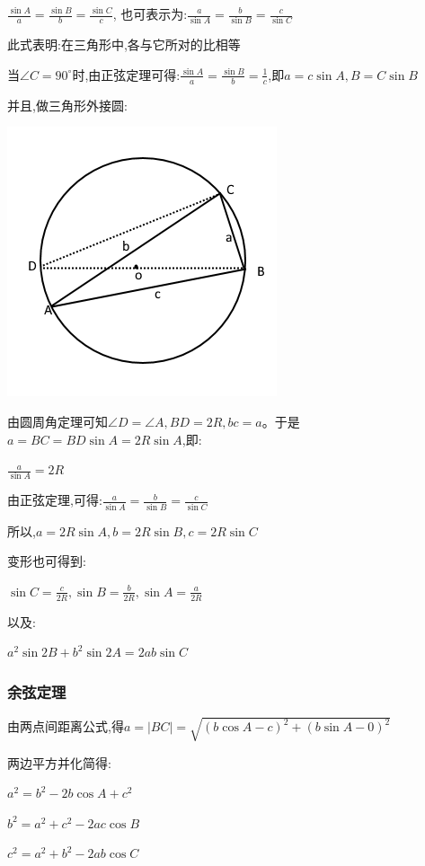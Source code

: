 \documentclass[UTF8]{ctexbook}
\newcommand{\degree}{^\circ}
\begin{document}
{{{$\frac{\sin A}{a} = \frac{\sin B}{b} = \frac{\sin C}{c}$, 也可表示为:$\frac{a}{\sin A} = \frac{b}{\sin B} = \frac{c}{\sin C}$

此式表明:在三角形中,各{}与它所对{}的比相等

当$\angle C = 90\degree$时,由正弦定理可得:$\frac{\sin A}{a} = \frac{\sin B}{b} = \frac{1}{c}$,即$a = c\sin A,B = C\sin B$

并且,做三角形外接圆:

\includegraphics[scale=0.5]{resources/insideTriangleAndCircleOutSide.png}

由圆周角定理可知$\angle D = \angle A,BD = 2R,bc = a$。于是$a = BC = BD\sin A = 2R\sin A$,即:

$\frac{a}{\sin A} = 2R$

由正弦定理,可得:$\frac{a}{\sin A} = \frac{b}{\sin B} = \frac{c}{\sin C}$

所以,$a = 2R\sin A,b = 2R\sin B,c = 2R\sin C$

变形也可得到:

$\sin C = \frac{c}{2R},\sin B = \frac{b}{2R},\sin A = \frac{a}{2R}$

以及:

$a^2\sin2B + b^2\sin2A = 2ab\sin C$
}%

\subsubsection{余弦定理}{
  由两点间距离公式,得$a = |BC| = \sqrt{(b\cos A - c)^2 + (b\sin A - 0)^2}$

  两边平方并化简得:

  $a^2 = b^2 - 2b\cos A + c^2$

  $b^2 = a^2 + c^2 - 2ac\cos B$

  $c^2 = a^2 + b^2 - 2ab\cos C$

}}}
\end{document}
